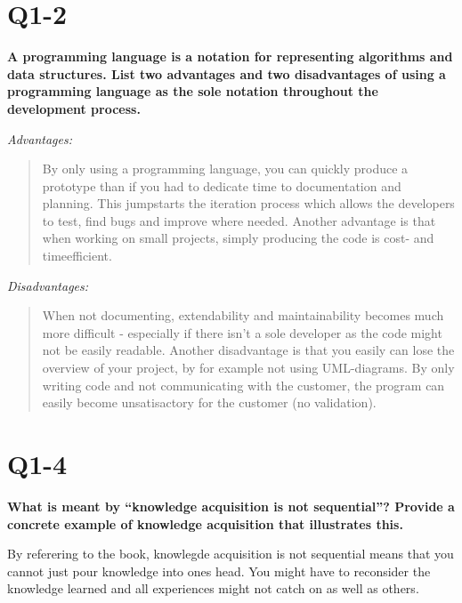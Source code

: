 \documentclass[12pt]{article}
\begin{document}
\maketitle

\pagebreak
\section{Q1-2}
\textbf{A programming language is a notation for representing algorithms and
data structures. List two advantages and two disadvantages of using a
programming language as the sole notation throughout the development
process. \\} 

\emph{Advantages:}
\begin{quote}
By only using a programming language, you can quickly produce a prototype than if you had to dedicate time to documentation and planning. 
This jumpstarts the iteration process which allows the developers to test, find bugs and improve where needed.
Another advantage is that when working on small projects, simply producing the code is cost- and timeefficient. \\
\end{quote}

\emph{Disadvantages:}
\begin{quote}
When not documenting, extendability and maintainability
becomes much more difficult - especially if there isn’t a sole
developer as the code might not be easily readable.
Another disadvantage is that you easily can lose the overview
of your project, by for example not using UML-diagrams.
By only writing code and not communicating with the
customer, the program can easily become unsatisactory for
the customer (no validation).
\end{quote}


\pagebreak
\section{Q1-4}
\textbf{What is meant by “knowledge acquisition is not sequential”? Provide a
concrete example of knowledge acquisition that illustrates this.\\}

By referering to the book, knowlegde acquisition is not sequential
means that you cannot just pour knowledge into ones head. You might
have to reconsider the knowledge learned and all experiences might not
catch on as well as others.\\
\end{document}
